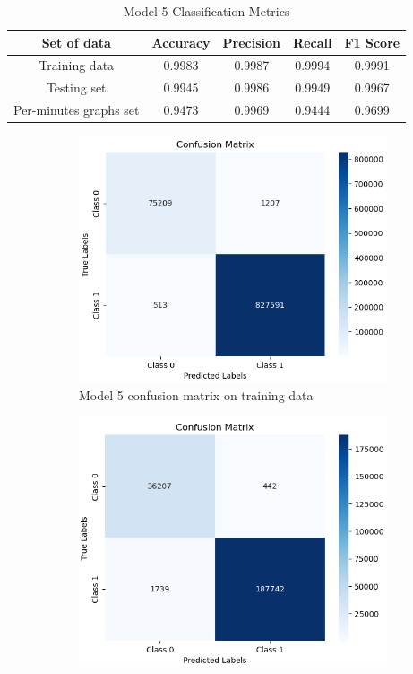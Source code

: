 \begin{table}[H]%
\centering
\begin{tabular}{|c|c|c|c|c|}
\hline
Set of data & Accuracy & Precision & Recall & F1 Score \\
\hline
Training data & 0.9983 & 0.9987 & 0.9994 & 0.9991 \\
\hline
Testing set & 0.9945 & 0.9986 & 0.9949 & 0.9967 \\
\hline
Per-minutes graphs set & 0.9473 & 0.9969 & 0.9444 & 0.9699 \\
\hline
\end{tabular}
\caption{Model 5 Classification Metrics}
\label{M5_tab}
\end{table}
\begin{figure}[H]%
    \centering
    \begin{subfigure}{0.49\textwidth}
        \centering
        \includegraphics[width=\linewidth]{figures/ev/do_2_cm1.png}
        \caption{Model 5 confusion matrix on training data}
    \label{fig:do_2_cm1}
    \end{subfigure}
    \begin{subfigure}{0.49\textwidth}
        \centering
         \includegraphics[width=\linewidth]{figures/ev/do_2_cm2.png}

\end{subfigure}
\end{figure}
